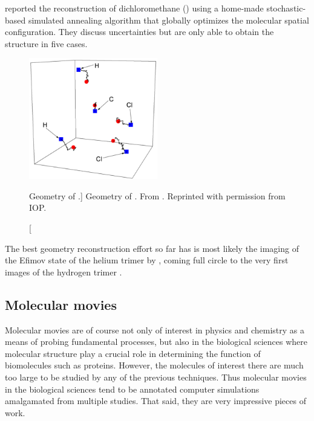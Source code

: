 \citet{Gagnon08} reported the reconstruction of dichloromethane () using a home-made \footnotemark stochastic-based simulated annealing algorithm that globally optimizes the molecular spatial configuration. They discuss uncertainties but are only able to obtain the structure in five cases.


\begin{figure}
  \centering
  \includegraphics[width=0.5\textwidth]{gfx/CH2Cl2Geometry}
  \caption
  [Geometry of .]
  {Geometry of . From \citet{Gagnon08}. Reprinted with permission from IOP.}
  \label{fig:CH2Cl2geometry}
\end{figure}

The best geometry reconstruction effort so far has is most likely the imaging of the Efimov state of the helium trimer by \citet{Kunitski15}, coming full circle to the very first images of the hydrogen trimer \citep{Gaillard78}.


\subsection{Molecular movies}
Molecular movies are of course not only of interest in physics and chemistry as a means of probing fundamental processes, but also in the biological sciences where molecular structure play a crucial role in determining the function of biomolecules such as proteins. However, the molecules of interest there are much too large to be studied by any of the previous techniques. Thus molecular movies in the biological sciences tend to be annotated computer simulations amalgamated from multiple studies. That said, they are very impressive pieces of work.

